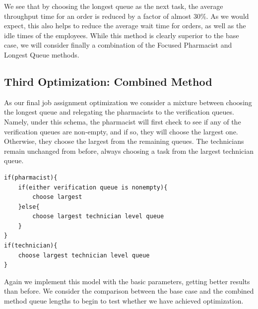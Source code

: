 \documentclass[10pt]{report}            %
\begin{document}
We see that by choosing the longest queue as the next task, the average throughput time for an order is reduced by a factor of almost $30\%$. As we would expect, this also helps to reduce the average wait time for orders, as well as the idle times of the employees.  While this method is clearly superior to the base case, we will consider finally a combination of the Focused Pharmacist and Longest Queue methods.
\subsection*{Third Optimization: Combined Method}
As our final job assignment optimization we consider a mixture between choosing the longest queue and relegating the pharmacists to the verification queues. Namely, under this schema, the pharmacist will first check to see if any of the verification queues are non-empty, and if so, they will choose the largest one. Otherwise, they choose the largest from the remaining queues. The technicians remain unchanged from before, always choosing a task from the largest technician queue.
\begin{verbatim}
if(pharmacist){
    if(either verification queue is nonempty){
        choose largest
    }else{
        choose largest technician level queue
    }
}
if(technician){
    choose largest technician level queue
}
\end{verbatim}
Again we implement this model with the basic parameters, getting better results than before. We consider the comparison between the base case and the combined method queue lengths to begin to test whether we have achieved optimization.
\end{document}
